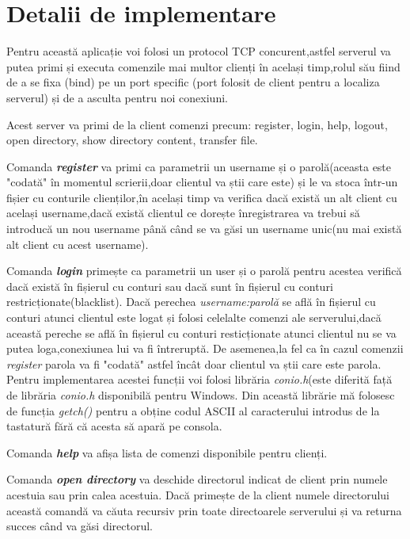 \documentclass[runningheads]{llncs}
\begin{document}
\section{Detalii de implementare}
\par Pentru această aplicație voi folosi un protocol TCP concurent,astfel serverul va putea primi și executa comenzile mai multor clienți în același timp,rolul său fiind de a se fixa (bind) pe un port specific (port folosit de client pentru a localiza serverul) și de a asculta pentru noi conexiuni.
\par Acest server va primi de la client comenzi precum: register, login, help, logout, open directory, show directory content, transfer file.
\par Comanda \textit{\textbf{register}} va primi ca parametrii un username și o parolă(aceasta este "codată" în momentul scrierii,doar clientul va știi care este) și le va stoca într-un fișier cu conturile clienților,în același timp va verifica dacă există un alt client cu același username,dacă există clientul ce dorește înregistrarea va trebui să introducă un nou username până când se va găsi un username unic(nu mai există alt client cu acest username).
\par Comanda \textit{\textbf{login}} primește ca parametrii un user și o parolă pentru acestea verifică dacă există în fișierul cu conturi sau dacă sunt în fișierul cu conturi restricționate(blacklist). Dacă perechea \textit{username:parolă} se află în fișierul cu conturi atunci clientul este logat și folosi celelalte comenzi ale serverului,dacă această pereche se află în fișierul  cu conturi resticționate atunci clientul nu se va putea loga,conexiunea lui va fi întreruptă. De asemenea,la fel ca în cazul comenzii \textit{register} parola va fi "codată" astfel încât doar clientul va știi care este parola. Pentru implementarea acestei funcții voi folosi librăria \textit{conio.h}(este diferită față de librăria \textit{conio.h} disponibilă pentru Windows. Din această librărie mă folosesc de funcția \textit{getch()} pentru a obține codul ASCII al caracterului introdus de la tastatură fără că acesta să apară pe consola.
\par Comanda \textit{\textbf{help}} va afișa lista de comenzi disponibile pentru clienți.
\par Comanda \textit{\textbf{open directory}} va deschide directorul indicat de client prin numele acestuia sau prin calea acestuia. Dacă primește de la client numele directorului această comandă va căuta recursiv prin toate directoarele serverului și va returna succes când va găsi directorul. 
\end{document}

